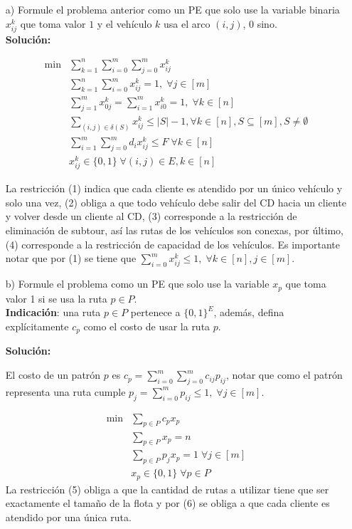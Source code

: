 \documentclass[10pt]{article}
\theoremstyle{plain}
\theoremstyle{definition}
\begin{document}
\begin{itemize}
\item[a)] Formule el problema anterior como un PE que solo use la variable binaria $x_{ij}^{k}$ que toma valor $1$ y el vehículo $k$ usa el arco $(i,j)$, 0 sino.\\

\textbf{Solución:}

\begin{align}
\min &\sum_{k=1}^{n}\sum_{i=0}^{m}\sum_{j=0}^{m} x_{ij}^{k}\nonumber\\ 
& \sum_{k=1}^{n}\sum_{i=0}^{m} x_{ij}^{k} = 1, \;\forall j \in [m]\\
& \sum_{j=1}^{m}x_{0j}^{k}=\sum_{i=1}^{m}x_{i0}^{k}=1, \; \forall k \in [n]\\
& \sum_{(i,j)\in \delta(S)}x_{ij}^{k}\leq |S|-1, \forall k\in[n], S\subseteq [m], S\neq\emptyset\\
& \sum_{i=1}^{m}\sum_{j=0}^{m} d_{i}x_{ij}^{k}\leq F \; \forall k \in [n]\\
& x_{ij}^{k}\in\{0,1\} \; \forall (i,j)\in E, k \in [n]\nonumber
\end{align}

La restricción (1) indica que cada cliente es atendido por un único vehículo y solo una vez, (2) obliga a que todo vehículo debe salir del CD hacia un cliente y volver desde un cliente al CD, (3) corresponde a la restricción de eliminación de subtour, así las rutas de los vehículos son conexas, por último, (4) corresponde a la restricción de capacidad de los vehículos. Es importante notar que por (1) se tiene que $\sum_{i=0}^{m}x_{ij}^{k}\leq 1, \; \forall k \in [n], j \in [m]$.

\item[b)] Formule el problema como un PE que solo use la variable $x_{p}$ que toma valor 1 si se usa la ruta $p\in P$.\\ \textbf{Indicación}: una ruta $p\in P$ pertenece a $\{0,1\}^{E}$, además, defina explícitamente $c_{p}$ como el costo de usar la ruta $p$.

\textbf{Solución:}

El costo de un patrón $p$ es $c_{p}=\sum_{i=0}^{m}\sum_{j=0}^{m}c_{ij}p_{ij}$, notar que como el patrón representa una ruta cumple $p_{j}=\sum_{i=0}^{m}p_{ij}\leq 1, \;\forall j \in [m]$.

\begin{align}
\min & \sum_{p\in P}c_{p}x_{p}\nonumber\\
& \sum_{p\in P}x_{p}=n\\
& \sum_{p\in P}p_{j}x_{p} = 1 \; \forall j \in [m]\\
& x_{p}\in\{0,1\} \; \forall p \in P\nonumber
\end{align}
La restricción (5) obliga a que la cantidad de rutas a utilizar tiene que ser exactamente el tamaño de la flota y por (6) se obliga a que cada cliente es atendido por una única ruta.


\end{itemize}
\end{document}

